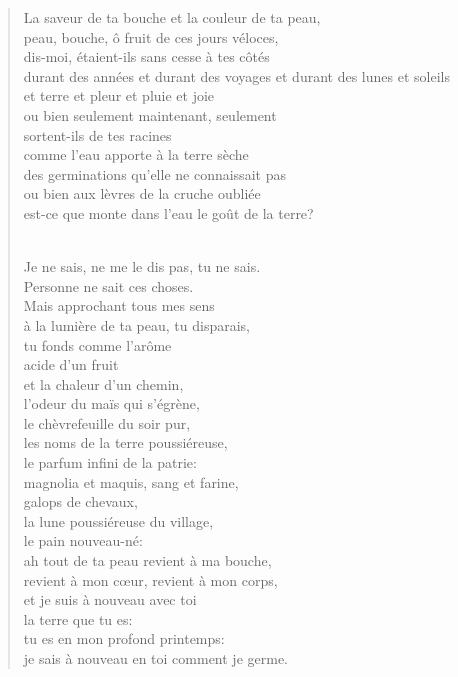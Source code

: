 \documentclass[11pt,a4paper]{book}
\begin{document}
\begin{verse}
La saveur de ta bouche et la couleur de ta peau, \\
peau, bouche, ô fruit de ces jours véloces, \\
dis-moi, étaient-ils sans cesse à tes côtés \\
durant des années et durant des voyages et durant des lunes et soleils
\\
et terre et pleur et pluie et joie \\
ou bien seulement maintenant, seulement \\
sortent-ils de tes racines \\
comme l'eau apporte à la terre sèche \\
des germinations qu'elle ne connaissait pas \\
ou bien aux lèvres de la cruche oubliée \\
est-ce que monte dans l'eau le goût de la terre? \\ \

Je ne sais, ne me le dis pas, tu ne sais. \\
Personne ne sait ces choses. \\
Mais approchant tous mes sens \\
à la lumière de ta peau, tu disparais, \\
tu fonds comme l'arôme \\
acide d'un fruit \\
et la chaleur d'un chemin, \\
l'odeur du maïs qui s'égrène, \\
le chèvrefeuille du soir pur, \\
les noms de la terre poussiéreuse, \\
le parfum infini de la patrie: \\
magnolia et maquis, sang et farine, \\
galops de chevaux, \\
la lune poussiéreuse du village, \\
le pain nouveau-né: \\
ah tout de ta peau revient à ma bouche, \\
revient à mon c{\oe}ur, revient à mon corps, \\
et je suis à nouveau avec toi \\
la terre que tu es: \\
tu es en mon profond printemps: \\
je sais à nouveau en toi comment je germe.
\end{verse}
\end{document}
